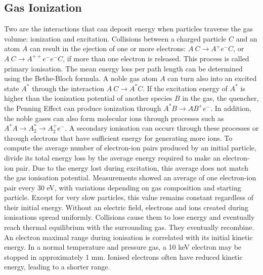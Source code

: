 \subsection{Gas Ionization}
Two are the interactions that can deposit energy when particles traverse the gas volume: ionization and excitation.
Collisions between a charged particle $C$ and an atom $A$ can result in the ejection of one or more electrons: 
$A \ C \rightarrow A^+ e^- C$, or $A \ C \rightarrow A^{++} e^- e^- C$, if more than one electron is released.
This process is called primary ionisation. The mean energy loss per path length can be determined using the Bethe-Bloch formula.
A noble gas atom $A$ can turn also into an excited state $A^*$ through the interaction $A \ C \rightarrow A^* C$. 
If the excitation energy of $A^*$ is higher than the ionization potential of another species $B$ in the gas, the quencher, the
Penning Effect can produce ionization through $A^*B \rightarrow A B^+ e^-$. In addition, the noble gases can
also form molecular ions through processes such as $A^* A \rightarrow A_{2}^{*} \rightarrow A^+_2 e^-$.
A secondary ionisation can occurr through these processes or through electrons that have sufficient energy for generating more ions.
To compute the average number of electron-ion pairs produced by an initial particle, divide its total energy loss 
by the average energy required to make an electron-ion pair. Due to the energy lost during excitation, this average 
does not match the gas ionisation potential. Measurements showed an average of one electron-ion pair every 
30 eV, with variations depending on gas composition and starting particle. Except for very slow particles, 
this value remains constant regardless of their initial energy.
Without an electric field, electrons and ions created during ionisations spread uniformly. 
Collisions cause them to lose energy and eventually reach thermal equilibrium with the surrounding gas. 
They eventually recombine. An electron maximal range during ionisation is correlated with its initial kinetic 
energy. In a normal temperature and pressure gas, a 10 keV electron may be stopped in approximately 1 mm. 
Ionised electrons often have reduced kinetic energy, leading to a shorter range.
